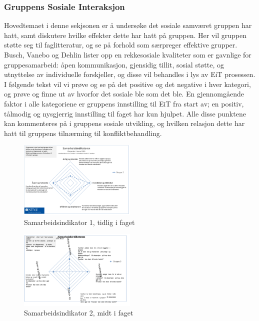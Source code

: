 \subsubsection{Gruppens Sosiale Interaksjon}

Hovedtemaet i denne sekjsonen er å undersøke det sosiale samværet gruppen har hatt, samt diskutere hvilke effekter dette har hatt på gruppen. Her vil gruppen støtte seg til faglitteratur\cite{orgorg}, og se på forhold som særpreger effektive grupper. Busch, Vanebo og Dehlin\cite[p.~257]{orgorg} lister opp en rekkesosiale kvaliteter som er gavnlige for gruppesamarbeid: åpen kommunikasjon, gjensidig tillit, sosial støtte, og utnyttelse av individuelle forskjeller, og disse vil behandles i lys av EiT prosessen. I følgende tekst vil vi prøve og se på det positive og det negative i hver kategori, og prøve og finne ut av hvorfor det sosiale ble som det ble. En gjennomgående faktor i alle kategoriene er gruppens innstilling til EiT fra start av; en positiv, tålmodig og nysgjerrig innstilling til faget har kun hjulpet. Alle disse punktene kan kommenteres på i gruppens sosiale utvikling, og hvilken relasjon dette har hatt til gruppens tilnærming til konfliktbehandling. 

\begin{figure}[h!]
  \caption{Samarbeidsindikator 1, tidlig i faget}
  \centering
    \includegraphics[width=0.5\textwidth]{Bilder/samarbeidsindikator1.png}
\end{figure}\label{samarbeidsindikator1}

\begin{figure}[h!]
  \caption{Samarbeidsindikator 2, midt i faget}
  \centering
    \includegraphics[width=0.5\textwidth]{Bilder/samarbeidsindikator_2.png}
\end{figure}\label{samarbeidsindikator2}


